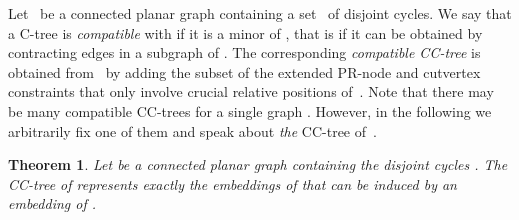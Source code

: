 \documentclass{scrartcl}
\newcommand{\1}[1]{{\normalfont \ensuremath{#1^{\tiny\circled{1}}}}} \newcommand{\2}[1]{{\normalfont \ensuremath{#1^{\tiny\circled{2}}}}} \renewcommand{\k}[1]{{\normalfont \ensuremath{#1^{\tiny\circled{k}}}}} \newcommand{\proj}[2]{\ensuremath{\left.#1\right|_{#2}}} \newcommand{\eps}{\varepsilon}
\theoremstyle{plain} \newtheorem{theorem}{Theorem} \newcounter{lemmacounter} \setcounter{lemmacounter}{0} \newtheorem{lemma}[lemmacounter]{Lemma} \newtheorem{fact}{Fact}  \newtheorem{corollary}{Corollary} \theoremstyle{definition} \newtheorem{definition}{Definition}
\begin{document}
Let~ be a connected planar graph containing a set~ of
disjoint cycles.  We say that a C-tree  is
\emph{compatible} with  if it is a minor of , that is if it can
be obtained by contracting edges in a subgraph of .  The
corresponding \emph{compatible CC-tree} is obtained from~ by adding the subset of the extended PR-node and
cutvertex constraints that only involve crucial relative positions
of~.  Note that there may be many compatible
CC-trees for a single graph .  However, in the following we
arbitrarily fix one of them and speak about \emph{the} CC-tree of~.

\begin{theorem}
  \label{thm:cycle-tree-is-rep}
  Let  be a connected planar graph containing the disjoint cycles
  .  The CC-tree  of 
  represents exactly the embeddings of  that can be
  induced by an embedding of .
\end{theorem}
\end{document}
